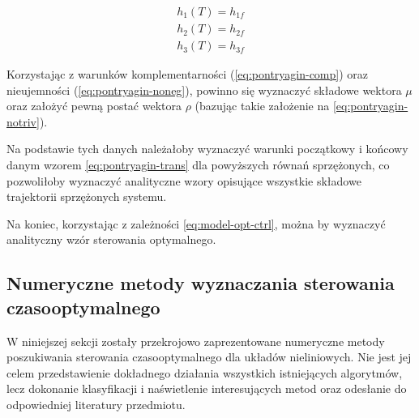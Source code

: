 \begin{equation}\label{eq:model-final-term}
\begin{array}{lr}
    h_{1}(T) = h_{1f}\\
    h_{2}(T) = h_{2f}\\
    h_{3}(T) = h_{3f}
\end{array}
\end{equation}

Korzystając z warunków komplementarności (\ref{eq:pontryagin-comp}) oraz nieujemności (\ref{eq:pontryagin-noneg}), powinno się wyznaczyć składowe wektora $\mu$ oraz założyć pewną postać wektora $\rho$ (bazując takie założenie na \ref{eq:pontryagin-notriv}).

Na podstawie tych danych należałoby wyznaczyć warunki początkowy i końcowy danym wzorem \ref{eq:pontryagin-trans} dla powyższych równań sprzężonych, co pozwoliłoby wyznaczyć analityczne wzory opisujące wszystkie składowe trajektorii sprzężonych systemu.

Na koniec, korzystając z zależności \ref{eq:model-opt-ctrl}, można by wyznaczyć analityczny wzór sterowania optymalnego.


\subsection{Numeryczne metody wyznaczania sterowania czasooptymalnego}
\label{sub:toc-num}

W niniejszej sekcji zostały przekrojowo zaprezentowane numeryczne metody poszukiwania sterowania czasooptymalnego dla układów nieliniowych.
Nie jest jej celem przedstawienie dokładnego działania wszystkich istniejących algorytmów, lecz dokonanie klasyfikacji i naświetlenie interesujących metod oraz odesłanie do odpowiedniej literatury przedmiotu.

